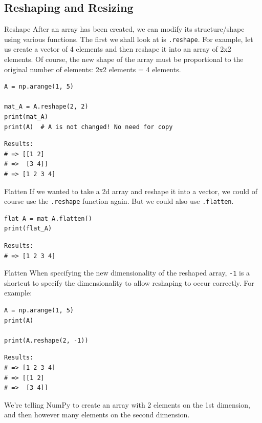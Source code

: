 \documentclass[10pt]{beamer}
\begin{document}
\subsection{Reshaping and Resizing}
\label{sec:org9d38b81}

\begin{frame}[label={sec:orgc2c4eb1},fragile]{Reshape}
 After an array has been created, we can modify its structure/shape using various
functions. The first we shall look at is \texttt{.reshape}. For example, let us create a
vector of 4 elements and then reshape it into an array of 2x2 elements. Of course,
the new shape of the array must be proportional to the original number of elements:
2x2 elements = 4 elements.

\begin{verbatim}
A = np.arange(1, 5)

mat_A = A.reshape(2, 2)
print(mat_A)
print(A)  # A is not changed! No need for copy
\end{verbatim}

\begin{verbatim}
Results: 
# => [[1 2]
# =>  [3 4]]
# => [1 2 3 4]
\end{verbatim}
\end{frame}

\begin{frame}[label={sec:org6d6e4e1},fragile]{Flatten}
 If we wanted to take a 2d array and reshape it into a vector, we could of course use
the \texttt{.reshape} function again. But we could also use \texttt{.flatten}.

\begin{verbatim}
flat_A = mat_A.flatten()
print(flat_A)
\end{verbatim}

\begin{verbatim}
Results: 
# => [1 2 3 4]
\end{verbatim}
\end{frame}

\begin{frame}[label={sec:org80770bf},fragile]{Flatten}
 When specifying the new dimensionality of the reshaped array, \texttt{-1} is a shortcut to
specify the dimensionality to allow reshaping to occur correctly. For example:

\begin{verbatim}
A = np.arange(1, 5)
print(A)

print(A.reshape(2, -1))
\end{verbatim}

\begin{verbatim}
Results: 
# => [1 2 3 4]
# => [[1 2]
# =>  [3 4]]
\end{verbatim}


We're telling NumPy to create an array with 2 elements on the 1st dimension, and then
however many elements on the second dimension.
\end{frame}
\end{document}
